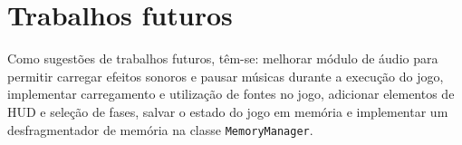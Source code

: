 \section{Trabalhos futuros}

Como sugestões de trabalhos futuros, têm-se: melhorar módulo de áudio para permitir carregar efeitos sonoros e pausar músicas durante a execução do jogo, implementar carregamento e utilização de fontes no jogo, adicionar elementos de HUD e seleção de fases, salvar o estado do jogo em memória e implementar um desfragmentador de memória na classe \texttt{MemoryManager}.

